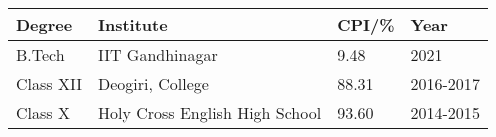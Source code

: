 


\begin{tabular}{ p{3.5cm} @{\hskip 0.3in} p{6cm} @{\hskip 0.3in} p{2.85cm} @{\hskip 0.3in} p{2.5cm} }
\hline
\textbf{Degree} & \textbf{Institute} & \textbf{CPI/\%}  & \textbf{Year} \\
\hline
B.Tech & IIT Gandhinagar  & 9.48 & 2021 \\
Class XII & Deogiri, College  & 88.31 & 2016-2017\\
Class X & Holy Cross English High School  & 93.60 & 2014-2015\\
\hline
\end{tabular}
